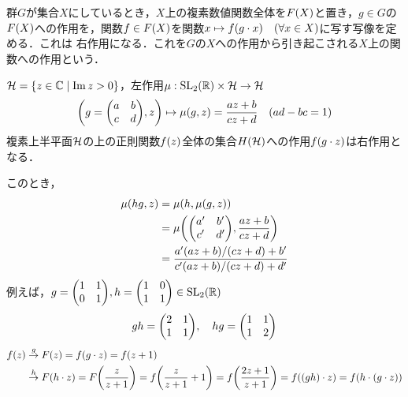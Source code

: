 \documentclass[main]{subfiles}
\begin{document}
		\begin{prop}[$G$集合$X$上の関数への作用]
			群$G$が集合$X$にしているとき，$X$上の複素数値関数全体を$F\qty(X)$と置き，$g\in G$の$F\qty(X)$への作用を，関数$f\in F\qty(X)$を関数$x\mapsto f\qty(g\cdot x)\quad\qty(\forall x\in X)$に写す写像を定める．これは{\color{red} 右作用}になる．これを$G$の$X$への作用から引き起こされる$X$上の関数への作用という．
		\end{prop}
		\begin{ex}
			$\mathcal{H}=\qty{z\in\ensuremath{\mathbb{C}}\mid\Im z>0}$，左作用$\mu:\text{SL}_2\qty(\mathbb{R})\times\mathcal{H}\to\mathcal{H}$
			\[\qty(g=\mqty(a&b\\c&d),z)\mapsto\mu\qty(g,z)=\frac{az+b}{cz+d}\quad\qty(ad-bc=1)\]
			複素上半平面$\mathcal{H}$の上の正則関数$f\qty(z)$全体の集合$H\qty(\mathcal{H})$への作用$f\qty(g\cdot z)$は右作用となる．

			このとき，
			\begin{align*}
				\mu\qty(hg,z) & =\mu\qty(h,\mu\qty(g,z))                                                                          \\
				              & =\mu\qty(\mqty(a^\prime                                                                & b^\prime \\c^\prime&d^\prime),\frac{az+b}{cz+d})\\
				              & =\frac{a^\prime\qty(az+b)/\qty(cz+d)+b^\prime}{c^\prime\qty(az+b)/\qty(cz+d)+d^\prime}
			\end{align*}
			例えば，$g=\mqty(1&1\\0&1),h=\mqty(1&0\\1&1)\in \SL_2\qty(\bbR)$
			\[gh=\mqty(2&1\\1&1),\quad hg=\mqty(1&1\\1&2)\]
			\begin{align*}
				f\qty(z) & \stackrel{g}{\to}F\qty(z)=f\qty(g\cdot z)=f\qty(z+1)                                                                                                    \\
				         & \stackrel{h}{\to}F\qty(h\cdot z)=F\qty(\frac{z}{z+1})=f\qty(\frac{z}{z+1}+1)=f\qty(\frac{2z+1}{z+1})=f\qty(\qty(gh)\cdot z)=f\qty(h\cdot\qty(g\cdot z))
			\end{align*}
		\end{ex}
\end{document}
